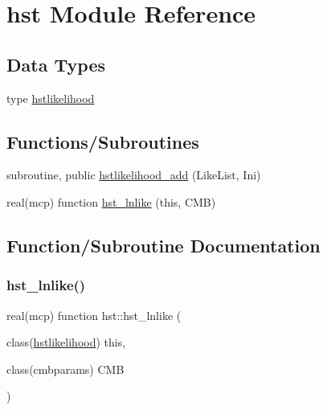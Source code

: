 \hypertarget{namespacehst}{}\section{hst Module Reference}
\label{namespacehst}
\subsection*{Data Types}
\begin{DoxyCompactItemize}
\item 
type \mbox{\hyperlink{structhst_1_1hstlikelihood}{hstlikelihood}}
\end{DoxyCompactItemize}
\subsection*{Functions/\+Subroutines}
\begin{DoxyCompactItemize}
\item 
subroutine, public \mbox{\hyperlink{namespacehst_aeb6aaa5b905562155375f8add86df3ec}{hstlikelihood\+\_\+add}} (Like\+List, Ini)
\item 
real(mcp) function \mbox{\hyperlink{namespacehst_a25a99c71d60066154487c7394a4b9591}{hst\+\_\+lnlike}} (this, C\+MB)
\end{DoxyCompactItemize}


\subsection{Function/\+Subroutine Documentation}
\mbox{\label{namespacehst_a25a99c71d60066154487c7394a4b9591}} 
\subsubsection{\texorpdfstring{hst\+\_\+lnlike()}{hst\_lnlike()}}
{\footnotesize\ttfamily real(mcp) function hst\+::hst\+\_\+lnlike (\begin{DoxyParamCaption}\item[{class(\mbox{\hyperlink{structhst_1_1hstlikelihood}{hstlikelihood}})}]{this,  }\item[{class(cmbparams)}]{C\+MB }\end{DoxyParamCaption})\hspace{0.3cm}{\ttfamily [private]}}

\mbox{\label{namespacehst_aeb6aaa5b905562155375f8add86df3ec}} 
